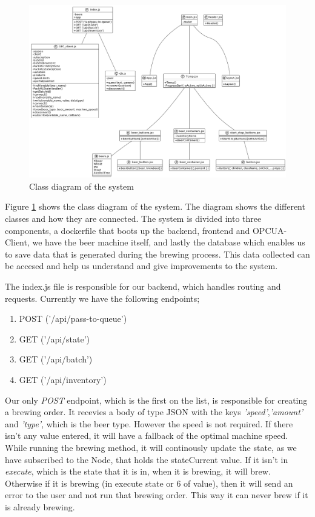 
\begin{center}
    \centering
    \begin{figure}[H]
        \includegraphics[width=1\textwidth]{img/class_diagram.png}
        \caption{Class diagram of the system}
        \label{fig:class_diagram}
    \end{figure}
\end{center}
Figure \ref{fig:class_diagram} shows the class diagram of the system. The diagram shows the different classes and how they are connected. The system is divided into three components, a dockerfile that boots up the backend, frontend and OPCUA-Client, we have the beer machine itself, and lastly the database which enables us to save data that is generated during the brewing process. This data collected can be accesed and help us understand and give improvements to the system.


The index.js file is responsible for our backend, which handles routing and requests. Currently we have the following endpoints;
\begin{enumerate}
    \item {POST ('/api/pass-to-queue')}
    \item {GET ('/api/state')}
    \item {GET ('/api/batch')}
    \item {GET ('/api/inventory')}
\end{enumerate}

Our only \textit{POST} endpoint, which is the first on the list, is responsible for creating a brewing order. It recevies a body of type JSON with the keys \textit{'speed'},\textit{'amount'} and \textit{'type'}, which is the beer type. However the speed is not required. If there isn't any value entered, it will have a fallback of the optimal machine speed.
While running the brewing method, it will continously update the state, as we have subscribed to the Node, that holds the stateCurrent value. If it isn't in \textit{execute}, which is the state that it is in, when it is brewing, it will brew. Otherwise if it is brewing (in execute state or 6 of value), then it will send an error to the user and not run that brewing order.
This way it can never brew if it is already brewing. \newline


